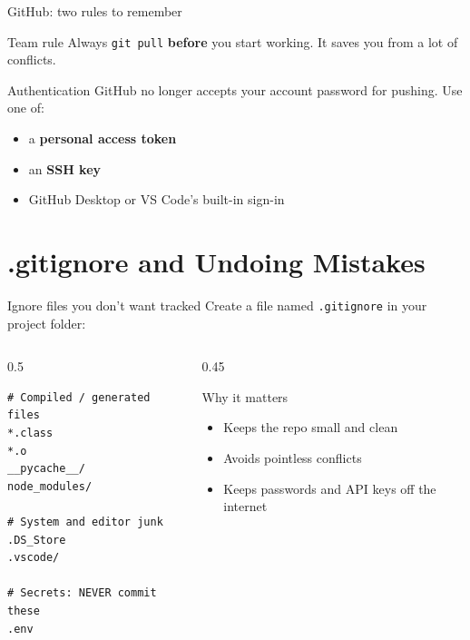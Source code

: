 \documentclass[aspectratio=169,11pt]{beamer}
\newcommand{\cmd}[1]{\texttt{\color{gitred}#1}}
\begin{document}
\begin{frame}{GitHub: two rules to remember}
  \begin{alertblock}{Team rule}
    Always \cmd{git pull} \textbf{before} you start working.
    It saves you from a lot of conflicts.
  \end{alertblock}

  \vspace{1em}
  \begin{block}{Authentication}
    GitHub no longer accepts your account password for pushing. Use one of:
    \begin{itemize}
      \item a \textbf{personal access token}
      \item an \textbf{SSH key}
      \item GitHub Desktop or VS Code's built-in sign-in
    \end{itemize}
  \end{block}
\end{frame}

\section{.gitignore and Undoing Mistakes}

\begin{frame}[fragile]{Ignore files you don't want tracked}
  Create a file named \texttt{.gitignore} in your project folder:

  \begin{columns}[T]
    \begin{column}{0.5\textwidth}
\begin{lstlisting}[language={}]
# Compiled / generated files
*.class
*.o
__pycache__/
node_modules/

# System and editor junk
.DS_Store
.vscode/

# Secrets: NEVER commit these
.env
\end{lstlisting}
    \end{column}
    \begin{column}{0.45\textwidth}
      \begin{alertblock}{Why it matters}
        \begin{itemize}
          \item Keeps the repo small and clean
          \item Avoids pointless conflicts
          \item Keeps passwords and API keys off the internet
        \end{itemize}
      \end{alertblock}
    \end{column}
  \end{columns}
\end{frame}
\end{document}
